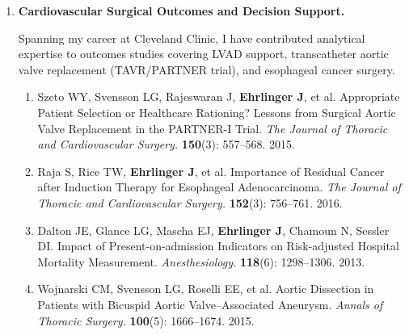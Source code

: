 \documentclass{nihbiosketch}
\begin{document}
\begin{enumerate}
My clinical collaboration work at Cleveland Clinic's Heart and Vascular
Institute yielded several high-impact contributions identifying risk factors and
predictive biomarkers for LVAD pump thrombosis. The 2014 NEJM paper documenting
an abrupt increase in LVAD thrombosis rates had immediate regulatory and
clinical implications nationally.

\begin{enumerate}
\item Starling RC, Moazami N, Silvestry SC, Ewald G, Rogers JG, Milano CA,
Rame JE, Acker MA, Blackstone EH, \textbf{Ehrlinger J}, et al. Unexpected
Abrupt Increase in Left Ventricular Assist Device Thrombosis. \textit{New
England Journal of Medicine.} \textbf{370}(1): 33--40. 2014.

\item Smedira NG, Blackstone EH, \textbf{Ehrlinger J}, Thuita L, Pierce CD,
Moazami N, Starling RC. Current risks of HeartMate II pump thrombosis.
\textit{The Journal of Heart and Lung Transplantation.} \textbf{34}(12):
1527--1534. 2015.

\item Wojnarski CM, Roselli EE, Idrees JJ, et al. Machine-learning phenotypic
classification of bicuspid aortopathy. \textit{The Journal of Thoracic and
Cardiovascular Surgery.} \textbf{155}(2): 461--469.e4. 2018.
\end{enumerate}

\item \textbf{Cardiovascular Surgical Outcomes and Decision Support.}

Spanning my career at Cleveland Clinic, I have contributed analytical expertise
to outcomes studies covering LVAD support, transcatheter aortic valve
replacement (TAVR/PARTNER trial), and esophageal cancer surgery.

\begin{enumerate}
\item Szeto WY, Svensson LG, Rajeswaran J, \textbf{Ehrlinger J}, et al.
Appropriate Patient Selection or Healthcare Rationing? Lessons from Surgical
Aortic Valve Replacement in the PARTNER-I Trial. \textit{The Journal of
Thoracic and Cardiovascular Surgery.} \textbf{150}(3): 557--568. 2015.

\item Raja S, Rice TW, \textbf{Ehrlinger J}, et al. Importance of Residual
Cancer after Induction Therapy for Esophageal Adenocarcinoma. \textit{The
Journal of Thoracic and Cardiovascular Surgery.} \textbf{152}(3): 756--761.
2016.

\item Dalton JE, Glance LG, Mascha EJ, \textbf{Ehrlinger J}, Chamoun N,
Sessler DI. Impact of Present-on-admission Indicators on Risk-adjusted Hospital
Mortality Measurement. \textit{Anesthesiology.} \textbf{118}(6): 1298--1306.
2013.

\item Wojnarski CM, Svensson LG, Roselli EE, et al. Aortic Dissection in
Patients with Bicuspid Aortic Valve--Associated Aneurysm. \textit{Annals of
Thoracic Surgery.} \textbf{100}(5): 1666--1674. 2015.
\end{enumerate}

\end{enumerate}
\end{document}
